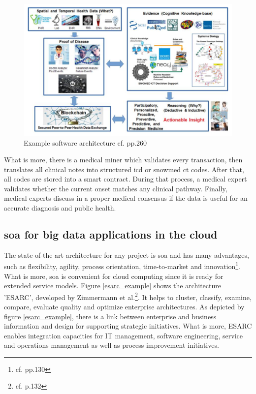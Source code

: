 \begin{figure}[htbp]
	\centering
	\includegraphics[width=1\textwidth]{images/example_software_architecture.png}
	\caption{Example software architecture cf.\autocite{talukder} pp.260}
	\label{example_software_architecture}
\end{figure}

What is more, there is a medical miner which validates every transaction, then translates all clinical notes into structured \ac{icd} or \ac{snowmed ct} codes. After that, all codes are stored into a smart contract. During that process, a medical expert validates whether the current onset matches any clinical pathway. 
Finally, medical experts discuss in a proper medical consensus if the data is useful for an accurate diagnosis and public health.

\subsection{\ac{soa} for big data applications in the cloud}
The state-of-the art architecture for any project is \ac{soa} and has many advantages, such as flexibility, agility, process orientation, time-to-market and innovation\footnote{cf.\autocite{zimmermann} pp.130}. What is more, \ac{soa} is convenient for cloud computing since it is ready for extended service models.
Figure \ref{esarc_example} shows the architecture 'ESARC', developed by Zimmermann et al.\footnote{cf.\autocite{zimmermann} p.132}. It helps to cluster, classify, examine, compare, evaluate quality and optimize enterprise architectures. As depicted by figure \ref{esarc_example}, there is a link between enterprise and business information and design for supporting strategic initiatives. What is more, ESARC enables integration capacities for \ac{IT} management, software engineering, service and operations management as well as process improvement initiatives.

